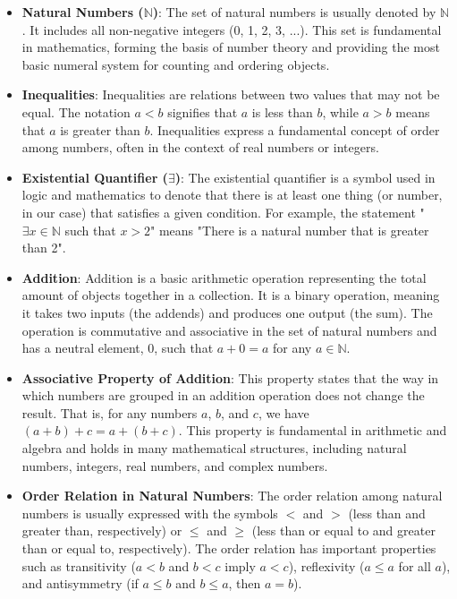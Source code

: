 \documentclass{article}
\begin{document}
\begin{itemize}
    \item {\bf Natural Numbers ($\mathbb{N}$)}: The set of natural numbers is usually denoted by $\mathbb{N}$. It includes all non-negative integers (0, 1, 2, 3, ...). This set is fundamental in mathematics, forming the basis of number theory and providing the most basic numeral system for counting and ordering objects.
    
    \item {\bf Inequalities}: Inequalities are relations between two values that may not be equal. The notation $a < b$ signifies that $a$ is less than $b$, while $a > b$ means that $a$ is greater than $b$. Inequalities express a fundamental concept of order among numbers, often in the context of real numbers or integers.
    
    \item {\bf Existential Quantifier ($\exists$)}: The existential quantifier is a symbol used in logic and mathematics to denote that there is at least one thing (or number, in our case) that satisfies a given condition. For example, the statement "$\exists x \in \mathbb{N}$ such that $x > 2$" means "There is a natural number that is greater than 2".
    
    \item {\bf Addition}: Addition is a basic arithmetic operation representing the total amount of objects together in a collection. It is a binary operation, meaning it takes two inputs (the addends) and produces one output (the sum). The operation is commutative and associative in the set of natural numbers and has a neutral element, 0, such that $a + 0 = a$ for any $a \in \mathbb{N}$.
    
    \item {\bf Associative Property of Addition}: This property states that the way in which numbers are grouped in an addition operation does not change the result. That is, for any numbers $a$, $b$, and $c$, we have $(a + b) + c = a + (b + c)$. This property is fundamental in arithmetic and algebra and holds in many mathematical structures, including natural numbers, integers, real numbers, and complex numbers.
    
    \item {\bf Order Relation in Natural Numbers}: The order relation among natural numbers is usually expressed with the symbols $<$ and $>$ (less than and greater than, respectively) or $\leq$ and $\geq$ (less than or equal to and greater than or equal to, respectively). The order relation has important properties such as transitivity ($a < b$ and $b < c$ imply $a < c$), reflexivity ($a \leq a$ for all $a$), and antisymmetry (if $a \leq b$ and $b \leq a$, then $a = b$).
    

\end{itemize}
\end{document}
